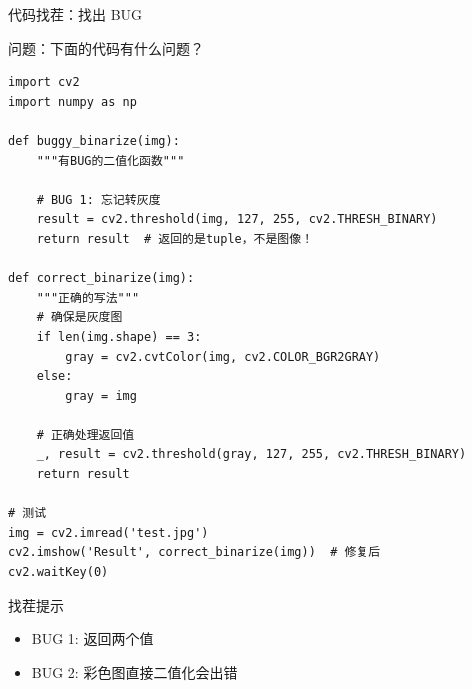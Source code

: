 \begin{frame}[fragile]{代码找茬：找出 BUG}
    \begin{block}{问题：下面的代码有什么问题？}
        \begin{lstlisting}[basicstyle=\ttfamily\scriptsize]
import cv2
import numpy as np

def buggy_binarize(img):
    """有BUG的二值化函数"""

    # BUG 1: 忘记转灰度
    result = cv2.threshold(img, 127, 255, cv2.THRESH_BINARY)
    return result  # 返回的是tuple，不是图像！

def correct_binarize(img):
    """正确的写法"""
    # 确保是灰度图
    if len(img.shape) == 3:
        gray = cv2.cvtColor(img, cv2.COLOR_BGR2GRAY)
    else:
        gray = img

    # 正确处理返回值
    _, result = cv2.threshold(gray, 127, 255, cv2.THRESH_BINARY)
    return result

# 测试
img = cv2.imread('test.jpg')
cv2.imshow('Result', correct_binarize(img))  # 修复后
cv2.waitKey(0)
        \end{lstlisting}
    \end{block}

    \begin{alertblock}{找茬提示}
        \begin{itemize}
            \item BUG 1:  返回两个值
            \item BUG 2: 彩色图直接二值化会出错
        \end{itemize}
    \end{alertblock}
\end{frame}
